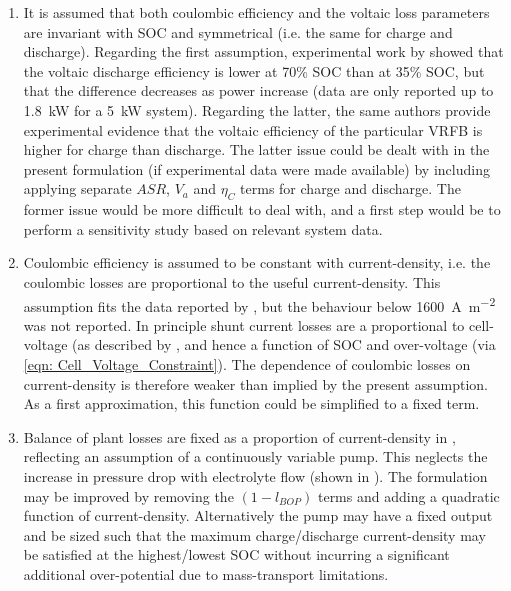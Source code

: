 \documentclass[preprint,3p,review,authoryear,10pt]{elsarticle}
\begin{document}
\begin{enumerate}

    \item It is assumed that both coulombic efficiency and the voltaic loss parameters are invariant with SOC and symmetrical (i.e. the same for charge and discharge). Regarding the first assumption, experimental work by \cite{Nguyen2014} showed that the voltaic discharge efficiency is lower at 70\% SOC than at 35\% SOC, but that the difference decreases as power increase (data are only reported up to \SI{1.8}{\kilo\watt} for a \SI{5}{\kilo\watt} system). Regarding the latter, the same authors provide experimental evidence that the voltaic efficiency of the particular VRFB is higher for charge than discharge. The latter issue could be dealt with in the present formulation (if experimental data were made available) by including applying separate $ASR$, $V_a$ and $\eta_{C}$ terms for charge and discharge. The former issue would be more difficult to deal with, and a first step would be to perform a sensitivity study based on relevant system data.
    
    \item Coulombic efficiency is assumed to be constant with current-density, i.e. the coulombic losses are proportional to the useful current-density. This assumption fits the data reported by \cite{Reed2016}, but the behaviour below \SI{1600}{\ampere\per\square\meter} was not reported. In principle shunt current losses are a proportional to cell-voltage (as described by \cite{Xing2011}, and hence a function of SOC and over-voltage (via \cref{eqn: Cell_Voltage_Constraint}). The dependence of coulombic losses on current-density is therefore weaker than implied by the present assumption. As a first approximation, this function could be simplified to a fixed term.
    
    \item Balance of plant losses are fixed as a proportion of current-density in , reflecting an assumption of a continuously variable pump. This neglects the increase in pressure drop with electrolyte flow (shown in \cite{Reed2016}). The formulation may be improved by removing the $(1-l_{BOP})$ terms and adding a quadratic function of current-density. Alternatively the pump may have a  fixed output and be sized such that the maximum charge/discharge current-density may be satisfied at the highest/lowest SOC without incurring a significant additional over-potential due to mass-transport limitations.
    

\end{enumerate}
\end{document}
